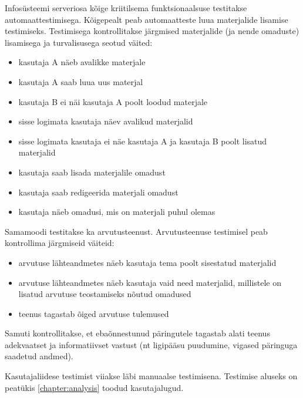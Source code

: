 \label{chapters:testing}
Infosüsteemi serveriosa kõige kriitilsema funktsionaalsuse testitakse automaattestimisega.
Kõigepealt peab automaatteste luua materjalide lisamise testimiseks. Testimisega kontrollitakse
järgmised materjalide (ja nende omaduste) lisamisega ja turvalisusega seotud väited:
\begin{itemize}
    \item kasutaja A näeb avalikke materjale
    \item kasutaja A saab luua uus materjal
    \item kasutaja B ei näi kasutaja A poolt loodud materjale
    \item sisse logimata kasutaja näev avalikud materjalid 
    \item sisse logimata kasutaja ei näe kasutaja A ja kasutaja B poolt lisatud materjalid
    \item kasutaja saab lisada materjalile omadust
    \item kasutaja saab redigeerida materjali omadust
    \item kasutaja näeb omadusi, mis on materjali puhul olemas
\end{itemize}

Samamoodi testitakse ka arvutusteenust. Arvutusteenuse testimisel peab kontrollima järgmiseid väiteid:
\begin{itemize}
    \item arvutuse lähteandmetes näeb kasutaja tema poolt sisestatud materjalid 
    \item arvutuse lähteandmetes näeb kasutaja vaid need materjalid, millistele on lisatud
    arvutuse teostamiseks nõutud omadused
    \item teenus tagastab õiged arvutuse tulemused
\end{itemize}

Samuti kontrollitakse, et ebaõnnestunud päringutele tagastab alati teenus adekvaatset ja informatiivset 
vastust (nt ligipääsu puudumine, vigased päringuga saadetud andmed).

Kasutajaliidese testimist viiakse läbi manuaalse testimisena. Testimise aluseks on peatükis \ref{chapter:analysis} 
toodud kasutajalugud.